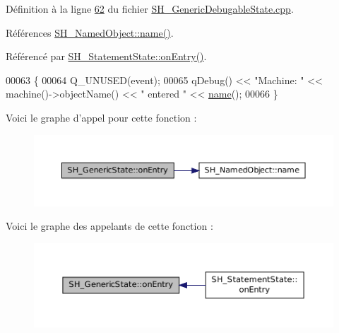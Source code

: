 Définition à la ligne \hyperlink{SH__GenericDebugableState_8cpp_source_l00062}{62} du fichier \hyperlink{SH__GenericDebugableState_8cpp_source}{S\-H\-\_\-\-Generic\-Debugable\-State.\-cpp}.



Références \hyperlink{classSH__NamedObject_a970f265df31b28b2179bbbceb6170ac2}{S\-H\-\_\-\-Named\-Object\-::name()}.



Référencé par \hyperlink{classSH__StatementState_ac62f9c27b2966034e56762a6e532dbe4}{S\-H\-\_\-\-Statement\-State\-::on\-Entry()}.


\begin{DoxyCode}
00063 \{
00064     Q\_UNUSED(event);
00065     qDebug() << \textcolor{stringliteral}{"Machine: "} << machine()->objectName() << \textcolor{stringliteral}{" entered "} << \hyperlink{classSH__NamedObject_a970f265df31b28b2179bbbceb6170ac2}{name}();
00066 \}
\end{DoxyCode}


Voici le graphe d'appel pour cette fonction \-:\nopagebreak
\begin{figure}[H]
\begin{center}
\leavevmode
\includegraphics[width=350pt]{classSH__GenericState_a7c30692635023ce7cf65e5ba5bb18a9c_cgraph}
\end{center}
\end{figure}




Voici le graphe des appelants de cette fonction \-:\nopagebreak
\begin{figure}[H]
\begin{center}
\leavevmode
\includegraphics[width=350pt]{classSH__GenericState_a7c30692635023ce7cf65e5ba5bb18a9c_icgraph}
\end{center}
\end{figure}


